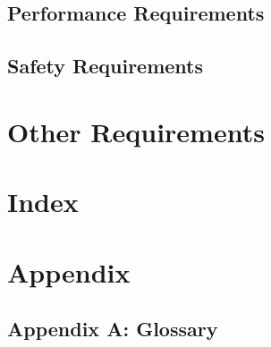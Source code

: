 \documentclass[compsoc,draftclsnofoot,onecolumn,10pt]{IEEEtran}
\begin{document}
\subsection{Performance Requirements}

\subsection{Safety Requirements}

\section{Other Requirements}

\section{Index}

\section{Appendix}

\subsection{Appendix A: Glossary}
\end{document}
